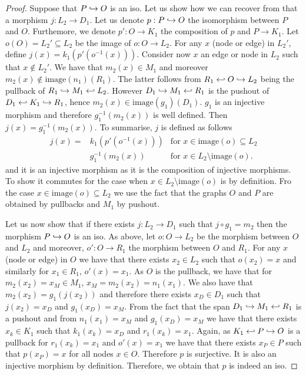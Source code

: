 \begin{proof}
    Suppose that $P\hookrightarrow O$ is an iso. Let us show how we can recover from that a morphism $j:L_2\to D_1$.
    Let us denote $p:P\hookrightarrow O$ the isomorphism between $P$ and $O$. Furthemore, we denote $p':O\to K_1$ the composition of $p$ and $P\to K_1$.
    Let $o(O) =L_2'\subseteq L_2$ be the image of $o:O\to L_2$. For any $x$ (node or edge) in $L_2'$, define $j(x) = k_1(p'(o^{-1}(x)))$. Consider now $x$ an edge or node in $L_2$ such that $x\notin L_2'$. We have that $m_2(x)\in M_1$ and moreover $m_2(x)\notin\text{image}(n_1)(R_1)$. The latter follows from $R_1 \hookleftarrow O\hookrightarrow L_2$ being the pullback of $R_1\hookrightarrow M_1\hookleftarrow L_2$. However $D_1\hookrightarrow M_1\hookleftarrow R_1$ is the pushout of $D_1\hookleftarrow K_1\hookrightarrow R_1$, hence $m_2(x)\in\text{image}(g_1)(D_1)$. $g_1$ is an injective morphism and therefore $g_1^{-1}(m_2(x))$ is well defined. Then $j(x) = g_1^{-1}(m_2(x))$. To summarise, $j$ is defined as follows
    \begin{align*}
      j(x) =& k_1(p'(o^{-1}(x))) &\text{for }x\in\text{image}(o)\subseteq L_2\\
      & g_1^{-1}(m_2(x))&\text{for }x\in L_2\setminus\text{image}(o).
    \end{align*}
and it is an injective morphism as it is the composition of injective morphisms. To show it commutes for the case when $x\in L_2\setminus\text{image}(o)$ is by definition. Fro the case $x\in\text{image}(o)\subseteq L_2$ we use the fact that the graphs $O$ and $P$ are obtained by pullbacks and $M_1$ by pushout.

Let us now show that if there exists $j:L_2\to D_1$ such that $j\circ g_1 = m_2$ then the morphism $P\hookrightarrow O$ is an iso. As above, let $o:O\to L_2$ be the morphism between $O$ and $L_2$ and moreover, $o':O\to R_1$ the morphism between $O$ and $R_1$.
%
For any $x$ (node or edge) in $O$ we have that there exists $x_2\in L_2$ such that $o(x_2)=x$ and similarly for $x_1\in R_1$, $o'(x)=x_1$. As $O$ is the pullback, we have that for $m_2(x_2) = x_M\in M_1$, $x_M = m_2(x_2) = n_1(x_1)$.
We also have that $m_2(x_2)=g_1(j(x_2))$ and therefore there exists $x_D\in D_1$ such that $j(x_2)=x_D$ and $g_1(x_D)=x_M$. From the fact that the span $D_1\hookrightarrow M_1\hookleftarrow R_1$ is a pushout and from $n_1(x_1)=x_M$ and $g_1(x_D)=x_M$ we have that there exists $x_k\in K_1$ such that $k_1(x_k) = x_D$ and $r_1(x_k)=x_1$. Again, as $K_1\hookleftarrow P \hookrightarrow O$ is a pullback for $r_1(x_k)=x_1$ and $o'(x)=x_1$ we have that there exists $x_P\in P$ such that $p(x_P)=x$ for all nodes $x\in O$. Therefore $p$ is surjective. It is also an injective morphism by definition. Therefore, we obtain that $p$ is indeed an iso.
 \end{proof}

